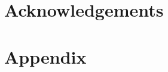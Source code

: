 \documentclass[final]{qutthesis}
\begin{document}
    \chapter{Acknowledgements}
    
    \clearpage
    

    \mainmatter
    
    
    
    
    
    
    
    
    \backmatter
    \chapter{Appendix}
    


    
    
    
\end{document}
